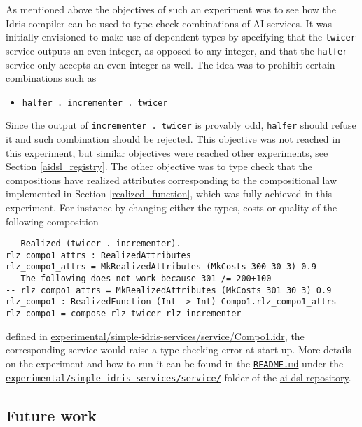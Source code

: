 \documentclass[]{report}
\newcommand{\nil}[2][]{\todo[color=purple,author=nil, #1]{#2}}
\begin{document}
As mentioned above the objectives of such an experiment was to see how
the Idris compiler can be used to type check combinations of AI
services.  It was initially envisioned to make use of dependent types
by specifying that the \texttt{twicer} service outputs an even
integer, as opposed to any integer, and that the \texttt{halfer}
service only accepts an even integer as well.  The idea was to
prohibit certain combinations such as
\begin{itemize}
\item \texttt{halfer . incrementer . twicer}
\end{itemize}
Since the output of \texttt{incrementer . twicer} is provably odd,
\texttt{halfer} should refuse it and such combination should be
rejected.  This objective was not reached in this experiment, but
similar objectives were reached other experiments, see Section
\ref{aidsl_registry}\nil{Add ref to Sam's work}.  The other objective
was to type check that the compositions have realized attributes
corresponding to the compositional law implemented in Section
\ref{realized_function}, which was fully achieved in this experiment.
For instance by changing either the types, costs or quality of the
following composition
\begin{verbatim}
-- Realized (twicer . incrementer).
rlz_compo1_attrs : RealizedAttributes
rlz_compo1_attrs = MkRealizedAttributes (MkCosts 300 30 3) 0.9
-- The following does not work because 301 /= 200+100
-- rlz_compo1_attrs = MkRealizedAttributes (MkCosts 301 30 3) 0.9
rlz_compo1 : RealizedFunction (Int -> Int) Compo1.rlz_compo1_attrs
rlz_compo1 = compose rlz_twicer rlz_incrementer
\end{verbatim}
defined in
\href{https://github.com/singnet/ai-dsl/blob/master/experimental/simple-idris-services/service/Compo1.idr}{experimental/simple-idris-services/service/Compo1.idr},
the corresponding service would raise a type checking error at start
up.  More details on the experiment and how to run it can be found in
the
\href{https://github.com/singnet/ai-dsl/blob/master/experimental/simple-idris-services/README.md}{\texttt{README.md}}
under the
\href{https://github.com/singnet/ai-dsl/blob/master/experimental/simple-idris-services/}{\texttt{experimental/simple-idris-services/service/}}
folder of the \href{https://github.com/singnet/ai-dsl/}{ai-dsl
  repository}.

\subsection{Future work}
\end{document}
